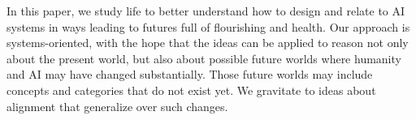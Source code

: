 \documentclass[12pt]{article}
\begin{document}








In this paper, we study life to better understand how to design and relate to AI systems in ways leading to futures full of flourishing and health. Our approach is systems-oriented, with the hope that the ideas can be applied to reason not only about the present world, but also about possible future worlds where humanity and AI may have changed substantially. Those future worlds may include concepts and categories that do not exist yet. We gravitate to ideas about alignment that generalize over such changes.



\end{document}
